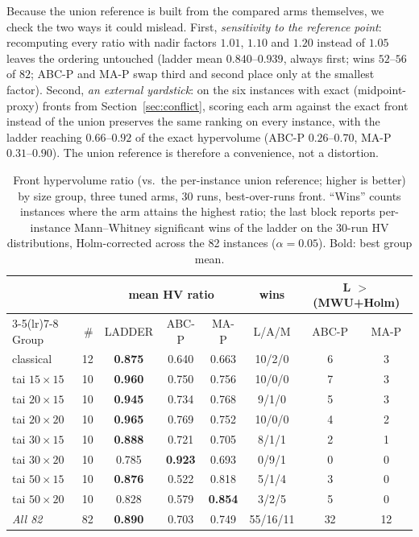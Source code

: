 \documentclass[preprint,12pt]{elsarticle}
\begin{document}
Because the union reference is built from the compared arms themselves, we
check the two ways it could mislead. First, \emph{sensitivity to the
reference point}: recomputing every ratio with nadir factors $1.01$, $1.10$
and $1.20$ instead of $1.05$ leaves the ordering untouched (ladder mean
$0.840$--$0.939$, always first; wins $52$--$56$ of $82$; ABC-P and MA-P
swap third and second place only at the smallest factor). Second,
\emph{an external yardstick}: on the six instances with exact
(midpoint-proxy) fronts from Section~\ref{sec:conflict}, scoring each arm
against the exact front instead of the union preserves the same ranking on
every instance, with the ladder reaching $0.66$--$0.92$ of the exact
hypervolume (ABC-P $0.26$--$0.70$, MA-P $0.31$--$0.90$). The union
reference is therefore a convenience, not a distortion.

\begin{table}[htb]
\centering\small
\caption{Front hypervolume ratio (vs.\ the per-instance union reference;
higher is better) by size group, three tuned arms, 30 runs, best-over-runs
front. ``Wins'' counts instances where the arm attains the highest ratio;
the last block reports per-instance Mann--Whitney significant wins of the
ladder on the 30-run HV distributions, Holm-corrected across the 82
instances ($\alpha=0.05$). Bold: best group mean.}
\label{tab:mo-full}
\begin{tabular}{l r ccc c cc}
\toprule
 & & \multicolumn{3}{c}{mean HV ratio} & wins & \multicolumn{2}{c}{L $>$ (MWU+Holm)} \\
\cmidrule(lr){3-5}\cmidrule(lr){7-8}
Group & \# & LADDER & ABC-P & MA-P & L/A/M & ABC-P & MA-P \\
\midrule
classical      & 12 & \textbf{0.875} & 0.640 & 0.663 & 10/2/0 & 6 & 3 \\
tai $15{\times}15$ & 10 & \textbf{0.960} & 0.750 & 0.756 & 10/0/0 & 7 & 3 \\
tai $20{\times}15$ & 10 & \textbf{0.945} & 0.734 & 0.768 & 9/1/0  & 5 & 3 \\
tai $20{\times}20$ & 10 & \textbf{0.965} & 0.769 & 0.752 & 10/0/0 & 4 & 2 \\
tai $30{\times}15$ & 10 & \textbf{0.888} & 0.721 & 0.705 & 8/1/1  & 2 & 1 \\
tai $30{\times}20$ & 10 & 0.785 & \textbf{0.923} & 0.693 & 0/9/1  & 0 & 0 \\
tai $50{\times}15$ & 10 & \textbf{0.876} & 0.522 & 0.818 & 5/1/4  & 3 & 0 \\
tai $50{\times}20$ & 10 & 0.828 & 0.579 & \textbf{0.854} & 3/2/5 & 5 & 0 \\
\midrule
\textit{All 82} & 82 & \textbf{0.890} & 0.703 & 0.749 & 55/16/11 & 32 & 12 \\
\bottomrule
\end{tabular}
\end{table}
\end{document}
